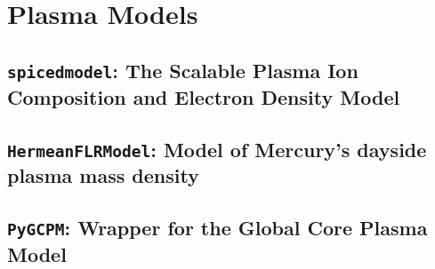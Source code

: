 \chapter{Plasma Models}

	\section{\texttt{spicedmodel}: The Scalable Plasma Ion Composition and Electron Density Model}

	\section{\texttt{HermeanFLRModel}: Model of Mercury's dayside plasma mass density}

	\section{\texttt{PyGCPM}: Wrapper for the Global Core Plasma Model}
	